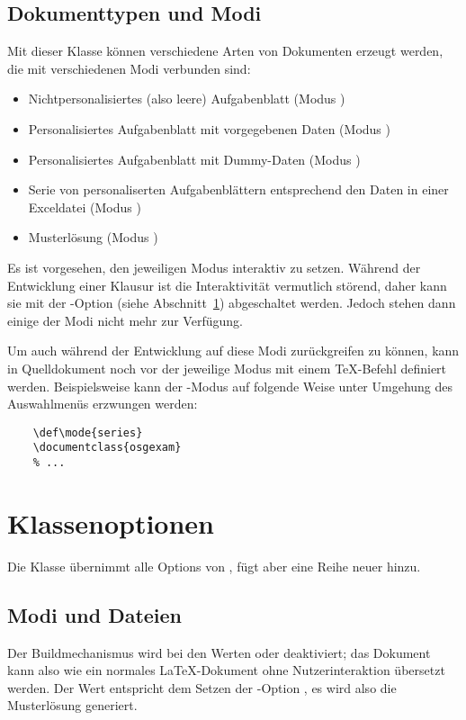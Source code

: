 \documentclass[
load=osgexam,
babel=ngerman
]{skdoc}
\begin{document}
\subsection{Dokumenttypen und Modi}
\label{sec:doctypes}
Mit dieser Klasse können verschiedene Arten von Dokumenten erzeugt werden, die mit verschiedenen Modi verbunden sind:
\begin{itemize}[nosep]
  \item Nichtpersonalisiertes (also leere) Aufgabenblatt (Modus )
  \item Personalisiertes Aufgabenblatt mit vorgegebenen Daten (Modus )
  \item Personalisiertes Aufgabenblatt mit Dummy-Daten (Modus )
  \item Serie von personaliserten Aufgabenblättern entsprechend den Daten in einer Exceldatei (Modus )
  \item Musterlösung  (Modus )
\end{itemize}
Es ist vorgesehen, den jeweiligen Modus interaktiv zu setzen.
Während der Entwicklung einer Klausur ist die Interaktivität vermutlich störend, daher kann sie mit der
-Option (siehe Abschnitt~\ref{sec:options}) abgeschaltet werden. Jedoch stehen dann einige der Modi nicht mehr zur
Verfügung.

Um auch während der Entwicklung auf diese Modi zurückgreifen zu können, kann in Quelldokument noch vor
 der jeweilige Modus mit einem \TeX-Befehl definiert werden.
Beispielsweise kann der -Modus auf folgende Weise unter Umgehung des Auswahlmenüs erzwungen werden:
\begin{lstlisting}
    \def\mode{series}
    \documentclass{osgexam}
    % ...
\end{lstlisting}

\section{Klassenoptionen}
\label{sec:options}
Die Klasse übernimmt alle Options von , fügt aber eine Reihe neuer hinzu.

\subsection*{Modi und Dateien}
Der Buildmechanismus wird bei den Werten  oder  deaktiviert; das Dokument kann also wie ein
normales \LaTeX-Dokument ohne Nutzerinteraktion übersetzt werden. Der Wert  entspricht dem Setzen der
-Option , es wird also die Musterlösung generiert.
\end{document}
